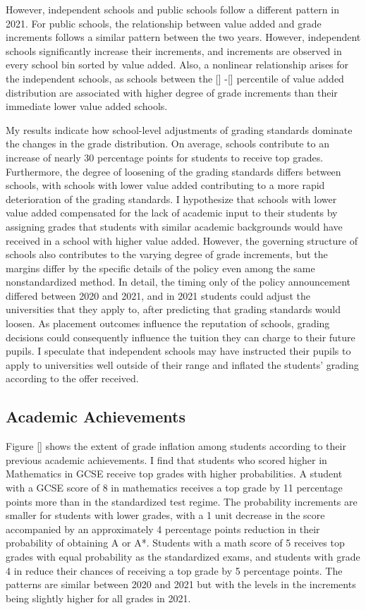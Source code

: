 However, independent schools and public schools follow a different pattern in 2021. For public schools, the relationship between value added and grade increments follows a similar pattern between the two years. However, independent schools significantly increase their increments, and increments are observed in every school bin sorted by value added.
Also, a nonlinear relationship arises for the independent schools, as schools between the [] -[] percentile of value added distribution are associated with higher degree of grade increments than their immediate lower value added schools.


My results indicate how school-level adjustments of grading standards dominate the changes in the grade distribution. On average, schools contribute to an increase of nearly 30 percentage points for students to receive top grades. Furthermore, the degree of loosening of the grading standards differs between schools, with schools with lower value added contributing to a more rapid deterioration of the grading standards. I hypothesize that schools with lower value added compensated for the lack of academic input to their students by assigning grades that students with similar academic backgrounds would have received in a school with higher value added. However, the governing structure of schools also contributes to the varying degree of grade increments, but the margins differ by the specific details of the policy even among the same nonstandardized method. In detail, the timing only of the policy announcement differed between 2020 and 2021, and in 2021 students could adjust the universities that they apply to, after predicting that grading standards would loosen. As placement outcomes influence the reputation of schools, grading decisions could consequently influence the tuition they can charge to their future pupils. I speculate that independent schools may have instructed their pupils to apply to universities well outside of their range and inflated the students' grading according to the offer received.
\subsection{Academic Achievements}
Figure [] shows the extent of grade inflation among students according to their previous academic achievements. I find that students who scored higher in Mathematics in GCSE receive top grades with higher probabilities. A student with a GCSE score of 8 in mathematics receives a top grade by 11 percentage points more than in the standardized test regime. The probability increments are smaller for students with lower grades, with a 1 unit decrease in the score accompanied by an approximately 4 percentage points reduction in their probability of obtaining A or A*. Students with a math score of 5 receives top grades with equal probability as the standardized exams, and students with grade 4 in reduce their chances of receiving a top grade by 5 percentage points. The patterns are similar between 2020 and 2021 but with the levels in the increments being slightly higher for all grades in 2021. 

